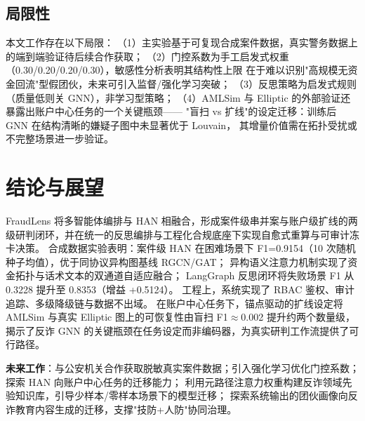 \documentclass[12pt,a4paper]{ctexart}
\begin{document}
\subsection{局限性}

本文工作存在以下局限：
（1）主实验基于可复现合成案件数据，真实警务数据上的端到端验证待后续合作获取；
（2）门控系数为手工启发式权重（0.30/0.20/0.20/0.30），敏感性分析表明其结构性上限
在于难以识别"高规模无资金回流"型假团伙，未来可引入监督/强化学习突破；
（3）反思策略为启发式规则（质量低则关 GNN），非学习型策略；
（4）AMLSim 与 Elliptic 的外部验证还暴露出账户中心任务的一个关键瓶颈——
"盲扫 vs 扩线"的设定迁移：训练后 GNN 在结构清晰的嫌疑子图中未显著优于 Louvain，
其增量价值需在拓扑受扰或不完整场景进一步验证。

\section{结论与展望}

FraudLens 将多智能体编排与 HAN 相融合，形成案件级串并案与账户级扩线的两级研判闭环，并在统一的反思编排与工程化合规底座下实现自愈式重算与可审计冻卡决策。
合成数据实验表明：案件级 HAN 在困难场景下 F1=0.9154（10 次随机种子均值），优于同协议异构图基线 RGCN/GAT；
异构语义注意力机制实现了资金拓扑与话术文本的双通道自适应融合；
LangGraph 反思闭环将失败场景 F1 从 0.3228 提升至 0.8353（增益 +0.5124）。
工程上，系统实现了 RBAC 鉴权、审计追踪、多级降级链与数据不出域。
在账户中心任务下，锚点驱动的扩线设定将 AMLSim 与真实 Elliptic 图上的可恢复性由盲扫 F1$\approx$0.002 提升约两个数量级，
揭示了反诈 GNN 的关键瓶颈在任务设定而非编码器，为真实研判工作流提供了可行路径。

\textbf{未来工作}：与公安机关合作获取脱敏真实案件数据；引入强化学习优化门控系数；
探索 HAN 向账户中心任务的迁移能力；
利用元路径注意力权重构建反诈领域先验知识库，引导少样本/零样本场景下的模型迁移；
探索系统输出的团伙画像向反诈教育内容生成的迁移，支撑"技防+人防"协同治理。



\end{document}
